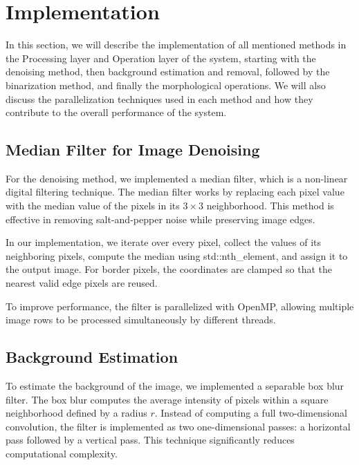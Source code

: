 \section{Implementation}
\label{sec:implementation}

In this section, we will describe the implementation of all mentioned methods in the Processing layer and Operation layer of the system, starting with the denoising method, then background estimation and removal, followed by the binarization method, and finally the morphological operations. We will also discuss the parallelization techniques used in each method and how they contribute to the overall performance of the system.
\subsection{Median Filter for Image Denoising}

For the denoising method, we implemented a median filter, which is a non-linear digital filtering technique. The median filter works by replacing each pixel value with the median value of the pixels in its $3 \times 3$ neighborhood. This method is effective in removing salt-and-pepper noise while preserving image edges.

In our implementation, we iterate over every pixel, collect the values of its neighboring pixels, compute the median using std::nth\_element, and assign it to the output image. For border pixels, the coordinates are clamped so that the nearest valid edge pixels are reused.

To improve performance, the filter is parallelized with OpenMP, allowing multiple image rows to be processed simultaneously by different threads.

\subsection{Background Estimation}

To estimate the background of the image, we implemented a separable box blur filter. 
The box blur computes the average intensity of pixels within a square neighborhood 
defined by a radius $r$. Instead of computing a full two-dimensional convolution, 
the filter is implemented as two one-dimensional passes: a horizontal pass followed 
by a vertical pass. This technique significantly reduces computational complexity.


